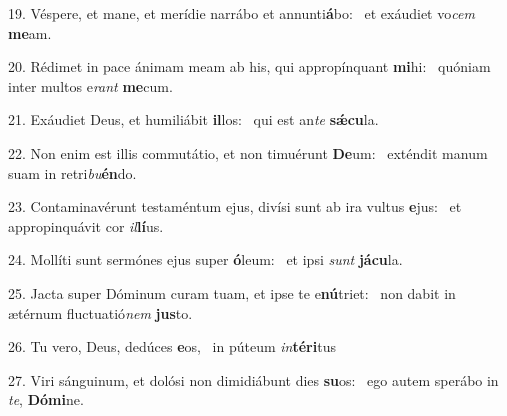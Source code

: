19. Véspere, et mane, et merídie narrábo et annunti\textbf{á}bo: \ast\  et exáudiet vo\textit{cem} \textbf{me}am.\

20. Rédimet in pace ánimam meam ab his, qui appropínquant \textbf{mi}hi: \ast\  quóniam inter multos e\textit{rant} \textbf{me}cum.\

21. Exáudiet Deus, et humiliábit \textbf{il}los: \ast\  qui est an\textit{te} \textbf{sǽ}\textbf{cu}la.\

22. Non enim est illis commutátio, et non timuérunt \textbf{De}um: \ast\  exténdit manum suam in retri\textit{bu}\textbf{én}do.\

23. Contaminavérunt testaméntum ejus, divísi sunt ab ira vultus \textbf{e}jus: \ast\  et appropinquávit cor \textit{il}\textbf{lí}us.\

24. Mollíti sunt sermónes ejus super \textbf{ó}leum: \ast\  et ipsi \textit{sunt} \textbf{já}\textbf{cu}la.\

25. Jacta super Dóminum curam tuam, et ipse te e\textbf{nú}triet: \ast\  non dabit in ætérnum fluctuatió\textit{nem} \textbf{jus}to.\

26. Tu vero, Deus, dedúces \textbf{e}os, \ast\  in púteum \textit{in}\textbf{tér}\textbf{i}tus\

27. Viri sánguinum, et dolósi non dimidiábunt dies \textbf{su}os: \ast\  ego autem sperábo in \textit{te}, \textbf{Dó}\textbf{mi}ne.\

